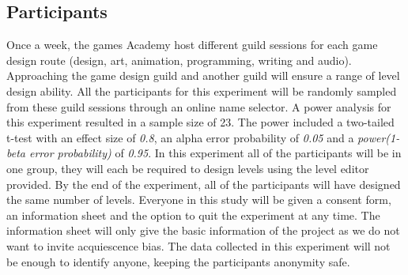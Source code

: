 \documentclass[journal]{IEEEtran}
\begin{document}
\subsection{Participants}
Once a week, the games Academy host different guild sessions for each game design route (design, art, animation, programming, writing and audio). Approaching the game design guild and another guild will ensure a range of level design ability. All the participants for this experiment will be randomly sampled from these guild sessions through an online name selector. A power analysis for this experiment resulted in a sample size of 23. The power included a two-tailed t-test with an effect size of \textit{0.8}, an alpha error probability of \textit{0.05} and a \textit{power(1- beta error probability)} of \textit{0.95}.  In this experiment all of the participants will be in one group, they will each be required to design levels using the level editor provided. By the end of the experiment, all of the participants will have designed the same number of levels. Everyone in this study will be given a consent form, an information sheet and the option to quit the experiment at any time. The information sheet will only give the basic information of the project as we do not want to invite acquiescence bias\cite{watson1992correcting}. The data collected in this experiment will not be enough to identify anyone, keeping the participants anonymity safe.
\end{document}
